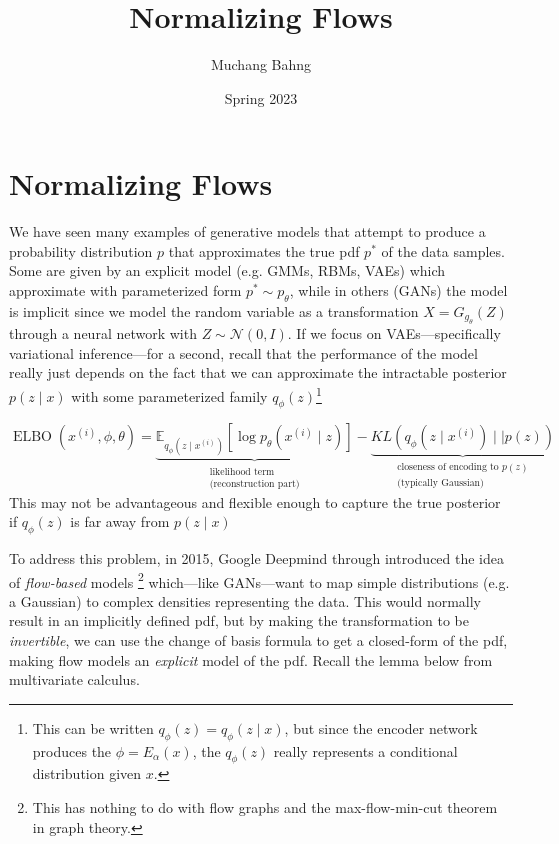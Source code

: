 \documentclass{article}
\DeclareMathOperator{\elbo}{ELBO}
\begin{document}

\title{Normalizing Flows}
\author{Muchang Bahng}
\date{Spring 2023}

\maketitle
\tableofcontents
\pagebreak 




\section{Normalizing Flows} 

  We have seen many examples of generative models that attempt to produce a probability distribution $p$ that approximates the true pdf $p^\ast$ of the data samples. Some are given by an explicit model (e.g. GMMs, RBMs, VAEs) which approximate with parameterized form $p^\ast \sim p_\theta$, while in others (GANs) the model is implicit since we model the random variable as a transformation $X = G_{g_\theta} (Z)$ through a neural network with $Z \sim \mathcal{N}(0, I)$. If we focus on VAEs---specifically variational inference---for a second, recall that the performance of the model really just depends on the fact that we can approximate the intractable posterior $p(z \mid x)$ with some parameterized family $q_\phi (z)$\footnote{This can be written $q_\phi (z) = q_\phi (z \mid x)$, but since the encoder network produces the $\phi = E_\alpha (x)$, the $q_\phi(z)$ really represents a conditional distribution given $x$.} 

  \begin{equation}
    \elbo(x^{(i)}, \phi, \theta) = \underbrace{\mathbb{E}_{q_\phi (z \mid x^{(i)})} [\log p_{\theta} (x^{(i)} \mid z)]}_{\substack{\text{likelihood term} \\ \text{(reconstruction part)}}}- \underbrace{KL(q_{\phi} (z \mid x^{(i)}) \mid\mid p(z))}_{\substack{\text{closeness of encoding to } p(z) \\ \text{(typically Gaussian)}}}
  \end{equation}
  This may not be advantageous and flexible enough to capture the true posterior if $q_\phi(z)$ is far away from $p(z \mid x)$

  To address this problem, in 2015, Google Deepmind through \cite{flow} introduced the idea of \textit{flow-based} models \footnote{This has nothing to do with flow graphs and the max-flow-min-cut theorem in graph theory.} which---like GANs---want to map simple distributions (e.g. a Gaussian) to complex densities representing the data. This would normally result in an implicitly defined pdf, but by making the transformation to be \textit{invertible}, we can use the change of basis formula to get a closed-form of the pdf, making flow models an \textit{explicit} model of the pdf. Recall the lemma below from multivariate calculus. 
  
\end{document}
